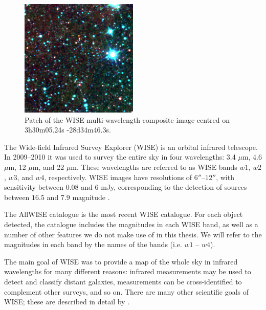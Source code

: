             \begin{figure}[!ht]
                \centering
                \includegraphics[width=0.5\textwidth]
                    {images/WISE_3h30m05.24s-28d34m46.3s.png}
                \caption{Patch of the WISE multi-wavelength composite image
                    centred on 3h30m05.24s -28d34m46.3s.}
                \label{fig:wise}
            \end{figure}

            The Wide-field Infrared Survey Explorer (WISE) is an orbital
            infrared telescope. In 2009--2010 it was used to survey the entire
            sky in four wavelengths: 3.4 $\mu$m, 4.6 $\mu$m, 12 $\mu$m, and 22
            $\mu$m. These wavelengths are referred to as WISE bands $w1$, $w2$,
            $w3$, and $w4$, respectively. WISE images have resolutions of
            $6''$--$12''$, with sensitivity between $0.08$ and $6$ mJy,
            corresponding to the detection of sources between $16.5$ and $7.9$
            magnitude \citep{wright10}.

            The AllWISE catalogue \citep{cutri13} is the most recent WISE
            catalogue. For each object detected, the catalogue includes the
            magnitudes in each WISE band, as well as a number of other features
            we do not make use of in this thesis. We will refer to the
            magnitudes in each band by the names of the bands (i.e. $w1$ --
            $w4$).

            The main goal of WISE was to provide a map of the whole sky in
            infrared wavelengths for many different reasons: infrared
            measurements may be used to detect and classify distant galaxies,
            measurements can be cross-identified to complement other surveys,
            and so on. There are many other scientific goals of WISE; these are
            described in detail by \citet{wright10}.

